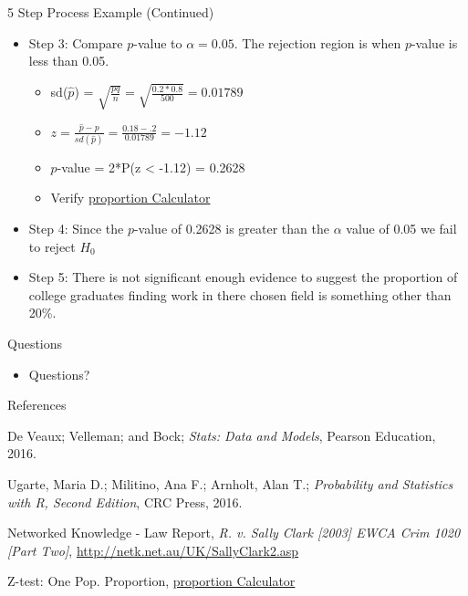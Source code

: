 \begin{frame}{5 Step Process Example (Continued)}

\begin{itemize}
\tightlist
\item
  Step 3: Compare \(p\)-value to \(\alpha = 0.05\). The rejection region
  is when \(p\)-value is less than 0.05.

  \begin{itemize}
  \tightlist
  \item
    sd(\(\hat{p}\)) =
    \(\sqrt{\frac{pq}{n}} = \sqrt{\frac{0.2*0.8}{500}} = 0.01789\)
  \item
    \(z = \frac{\hat{p}-p}{sd(\hat{p})} = \frac{0.18-.2}{0.01789} = -1.12\)
  \item
    \(p\)-value = 2*P(z \textless{} -1.12) = 0.2628
  \item
    Verify
    \href{https://mathcracker.com/z-test-for-one-proportion.php}{proportion
    Calculator}
  \end{itemize}
\item
  Step 4: Since the \(p\)-value of 0.2628 is greater than the \(\alpha\)
  value of 0.05 we fail to reject \(H_0\)
\item
  Step 5: There is not significant enough evidence to suggest the
  proportion of college graduates finding work in there chosen field is
  something other than 20\%.
\end{itemize}

\end{frame}

\begin{frame}{Questions}

\begin{itemize}
\tightlist
\item
  Questions?
\end{itemize}

\end{frame}

\begin{frame}{References}

De Veaux; Velleman; and Bock; \emph{Stats: Data and Models}, Pearson
Education, 2016.

Ugarte, Maria D.; Militino, Ana F.; Arnholt, Alan T.; \emph{Probability
and Statistics with R, Second Edition}, CRC Press, 2016.

Networked Knowledge - Law Report, \emph{R. v. Sally Clark {[}2003{]}
EWCA Crim 1020 {[}Part Two{]}},
\url{http://netk.net.au/UK/SallyClark2.asp}

Z-test: One Pop. Proportion,
\href{https://mathcracker.com/z-test-for-one-proportion.php}{proportion
Calculator}

\end{frame}
